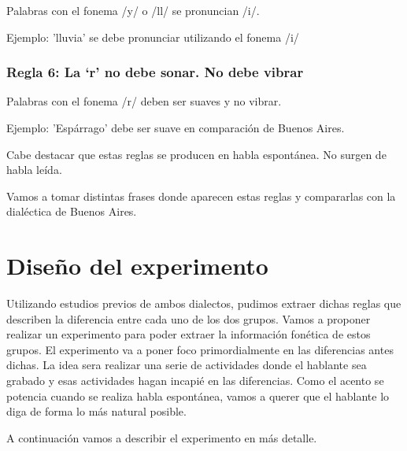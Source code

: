 \documentclass[11pt,a4paper,twoside]{tesis}
\begin{document}
Palabras con el fonema /y/ o /ll/ se pronuncian /i/. 


Ejemplo: 'lluvia' se debe pronunciar utilizando el fonema /i/ 

\subsection*{Regla 6: La ‘r’ no debe sonar. No debe vibrar}

Palabras con el fonema /r/ deben ser suaves y no vibrar. 

Ejemplo: 'Espárrago' debe ser suave en comparación de Buenos Aires. 

Cabe destacar que estas reglas se producen en habla espontánea. No surgen de habla leída. 

Vamos a tomar distintas frases donde aparecen estas reglas y compararlas con la dialéctica de Buenos Aires. 

\chapter{Diseño del experimento}


Utilizando estudios previos de ambos dialectos, pudimos extraer dichas reglas que describen la diferencia entre cada uno de los dos grupos. Vamos a proponer realizar un experimento para poder extraer la información fonética de estos grupos. El experimento va a poner foco primordialmente en las diferencias antes dichas. La idea sera realizar una serie de actividades donde el hablante sea grabado y esas actividades hagan incapié en las diferencias. Como el acento se potencia cuando se realiza habla espontánea, vamos a querer que el hablante lo diga de forma lo más natural posible. 

A continuación vamos a describir el experimento en más detalle.

\end{document}

